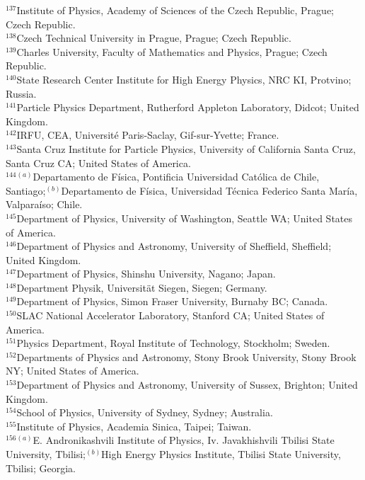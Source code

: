 \begin{flushleft}
$^{137}$Institute of Physics, Academy of Sciences of the Czech Republic, Prague; Czech Republic.\\
$^{138}$Czech Technical University in Prague, Prague; Czech Republic.\\
$^{139}$Charles University, Faculty of Mathematics and Physics, Prague; Czech Republic.\\
$^{140}$State Research Center Institute for High Energy Physics, NRC KI, Protvino; Russia.\\
$^{141}$Particle Physics Department, Rutherford Appleton Laboratory, Didcot; United Kingdom.\\
$^{142}$IRFU, CEA, Universit\'e Paris-Saclay, Gif-sur-Yvette; France.\\
$^{143}$Santa Cruz Institute for Particle Physics, University of California Santa Cruz, Santa Cruz CA; United States of America.\\
$^{144}$$^{(a)}$Departamento de F\'isica, Pontificia Universidad Cat\'olica de Chile, Santiago;$^{(b)}$Departamento de F\'isica, Universidad T\'ecnica Federico Santa Mar\'ia, Valpara\'iso; Chile.\\
$^{145}$Department of Physics, University of Washington, Seattle WA; United States of America.\\
$^{146}$Department of Physics and Astronomy, University of Sheffield, Sheffield; United Kingdom.\\
$^{147}$Department of Physics, Shinshu University, Nagano; Japan.\\
$^{148}$Department Physik, Universit\"{a}t Siegen, Siegen; Germany.\\
$^{149}$Department of Physics, Simon Fraser University, Burnaby BC; Canada.\\
$^{150}$SLAC National Accelerator Laboratory, Stanford CA; United States of America.\\
$^{151}$Physics Department, Royal Institute of Technology, Stockholm; Sweden.\\
$^{152}$Departments of Physics and Astronomy, Stony Brook University, Stony Brook NY; United States of America.\\
$^{153}$Department of Physics and Astronomy, University of Sussex, Brighton; United Kingdom.\\
$^{154}$School of Physics, University of Sydney, Sydney; Australia.\\
$^{155}$Institute of Physics, Academia Sinica, Taipei; Taiwan.\\
$^{156}$$^{(a)}$E. Andronikashvili Institute of Physics, Iv. Javakhishvili Tbilisi State University, Tbilisi;$^{(b)}$High Energy Physics Institute, Tbilisi State University, Tbilisi; Georgia.\\

\end{flushleft}
